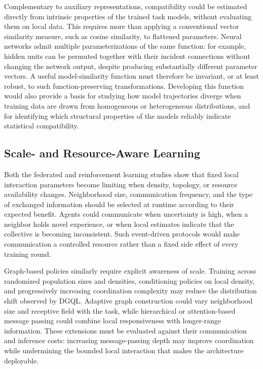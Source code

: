 Complementary to auxiliary representations, 
 compatibility could be estimated directly from intrinsic properties of the trained task models, 
 without evaluating them on local data. 
% 
This requires more than applying a conventional vector similarity measure, 
 such as cosine similarity, to flattened parameters. 
% 
Neural networks admit multiple parameterizations of the same function: 
 for example, hidden units can be permuted together with their incident connections 
 without changing the network output, despite producing substantially different parameter vectors. 
% 
A useful model-similarity function must therefore be invariant, 
 or at least robust, to such function-preserving transformations.
%
Developing this function would also provide a basis for studying how model trajectories diverge 
 when training data are drawn from homogeneous or heterogeneous distributions, 
 and for identifying which structural properties of the models reliably indicate statistical compatibility.

\subsection{Scale- and Resource-Aware Learning}

Both the federated and reinforcement learning studies show that 
 fixed local interaction parameters become limiting when density, topology, 
 or resource availability changes.
%
Neighborhood size, communication frequency, and the type of exchanged information 
 should be selected at runtime according to their expected benefit.
%
Agents could communicate when uncertainty is high, 
 when a neighbor holds novel experience, or when local estimates indicate that 
 the collective is becoming inconsistent. 
% 
Such event-driven protocols would make communication a controlled
 resource rather than a fixed side effect of every training round.

Graph-based policies similarly require explicit awareness of scale.
%
Training across randomized population sizes and densities, conditioning policies on local density, 
 and progressively increasing coordination complexity may reduce the distribution shift observed by DGQL. 
% 
Adaptive graph construction could vary neighborhood size and receptive field with the task, 
 while hierarchical or attention-based message passing could combine local responsiveness with
 longer-range information. 
% 
These extensions must be evaluated against their communication and inference costs: 
 increasing message-passing depth may improve coordination while undermining the bounded local interaction 
 that makes the architecture deployable.

